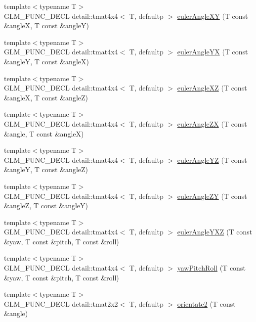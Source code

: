 \begin{CompactItemize}
\item 
{\footnotesize template$<$typename T$>$ }\\GLM\_\-FUNC\_\-DECL detail::tmat4x4$<$ T, defaultp $>$ \hyperlink{group__gtx__euler__angles_g6a2dc9bf80aecdffb3e5ab3bcede6647}{eulerAngleXY} (T const \&angleX, T const \&angleY)
\item 
{\footnotesize template$<$typename T$>$ }\\GLM\_\-FUNC\_\-DECL detail::tmat4x4$<$ T, defaultp $>$ \hyperlink{group__gtx__euler__angles_gd26afd5add0e121296d3b44dea32f32e}{eulerAngleYX} (T const \&angleY, T const \&angleX)
\item 
{\footnotesize template$<$typename T$>$ }\\GLM\_\-FUNC\_\-DECL detail::tmat4x4$<$ T, defaultp $>$ \hyperlink{group__gtx__euler__angles_g9b63e52fda0b7773c50bbf3c310bdcf2}{eulerAngleXZ} (T const \&angleX, T const \&angleZ)
\item 
{\footnotesize template$<$typename T$>$ }\\GLM\_\-FUNC\_\-DECL detail::tmat4x4$<$ T, defaultp $>$ \hyperlink{group__gtx__euler__angles_g3709f9eb45b49ecf41d42bec91c031fa}{eulerAngleZX} (T const \&angle, T const \&angleX)
\item 
{\footnotesize template$<$typename T$>$ }\\GLM\_\-FUNC\_\-DECL detail::tmat4x4$<$ T, defaultp $>$ \hyperlink{group__gtx__euler__angles_g9ac024a16439421d2a3c7c17b6df31b5}{eulerAngleYZ} (T const \&angleY, T const \&angleZ)
\item 
{\footnotesize template$<$typename T$>$ }\\GLM\_\-FUNC\_\-DECL detail::tmat4x4$<$ T, defaultp $>$ \hyperlink{group__gtx__euler__angles_gfcd7d34bef520fd8bee6d4d865a8162a}{eulerAngleZY} (T const \&angleZ, T const \&angleY)
\item 
{\footnotesize template$<$typename T$>$ }\\GLM\_\-FUNC\_\-DECL detail::tmat4x4$<$ T, defaultp $>$ \hyperlink{group__gtx__euler__angles_g7ba74fb9419dd90256b682855e904159}{eulerAngleYXZ} (T const \&yaw, T const \&pitch, T const \&roll)
\item 
{\footnotesize template$<$typename T$>$ }\\GLM\_\-FUNC\_\-DECL detail::tmat4x4$<$ T, defaultp $>$ \hyperlink{group__gtx__euler__angles_ga254d26a7a42b65101f4eee88d5b153f}{yawPitchRoll} (T const \&yaw, T const \&pitch, T const \&roll)
\item 
{\footnotesize template$<$typename T$>$ }\\GLM\_\-FUNC\_\-DECL detail::tmat2x2$<$ T, defaultp $>$ \hyperlink{group__gtx__euler__angles_g026f776506cd9c5b144c6d4b410a079b}{orientate2} (T const \&angle)

\end{CompactItemize}
